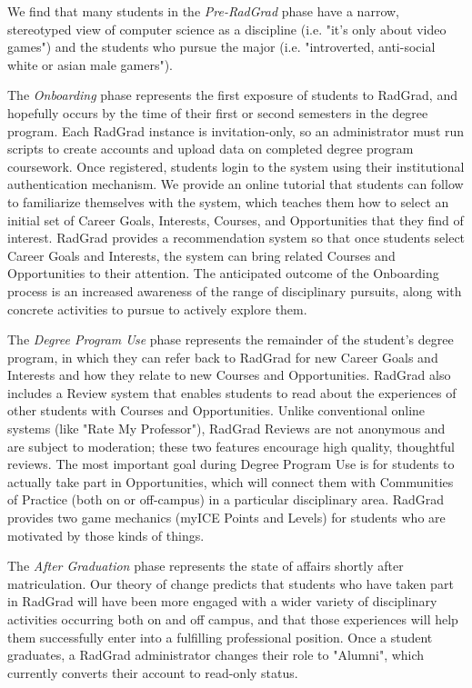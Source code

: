 \documentclass[acmsmall]{acmart}
\begin{document}
We find that many students in the {\em Pre-RadGrad} phase have a narrow, stereotyped view of computer science as a discipline (i.e. "it's only about video games") and the students who pursue the major (i.e. "introverted, anti-social white or asian male gamers").

The {\em Onboarding} phase represents the first exposure of students to RadGrad, and hopefully occurs by the time of their first or second semesters in the degree program. Each RadGrad instance is invitation-only, so an administrator must run scripts to create accounts and upload data on completed degree program coursework. Once registered, students login to the system using their institutional authentication mechanism. We provide an online tutorial \cite{johnson_radgrad_2022} that students can follow to familiarize themselves with the system, which teaches them how to select an initial set of Career Goals, Interests, Courses, and Opportunities that they find of interest. RadGrad provides a recommendation system so that once students select Career Goals and Interests, the system can bring related Courses and Opportunities to their attention.  The anticipated outcome of the Onboarding process is an increased awareness of the range of disciplinary pursuits, along with concrete activities to pursue to actively explore them.

The {\em Degree Program Use} phase represents the remainder of the student's degree program, in which they can refer back to RadGrad for new Career Goals and Interests and how they relate to new Courses and Opportunities. RadGrad also includes a Review system that enables students to read about the experiences of other students with Courses and Opportunities. Unlike conventional online systems (like "Rate My Professor"), RadGrad Reviews are not anonymous and are subject to moderation; these two features encourage high quality, thoughtful reviews.  The most important goal during Degree Program Use is for students to actually take part in Opportunities, which will connect them with Communities of Practice (both on or off-campus) in a particular disciplinary area. RadGrad provides two game mechanics (myICE Points and Levels) for students who are motivated by those kinds of things.

The {\em After Graduation} phase represents the state of affairs shortly after matriculation.  Our theory of change predicts that students who have taken part in RadGrad will have been more engaged with a wider variety of disciplinary activities occurring both on and off campus, and that those experiences will help them successfully enter into a fulfilling professional position. Once a student graduates, a RadGrad administrator changes their role to "Alumni", which currently converts their account to read-only status.
\end{document}
